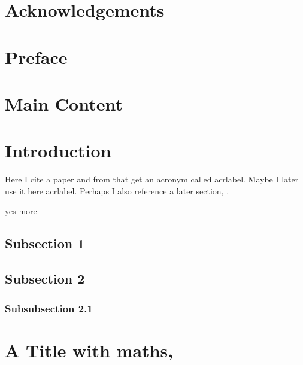 \documentclass[12pt]{article}
\begin{document}
\section*{Acknowledgements}\label{Acknowledgements}
\vspace{2em}

\section*{Preface}\label{Preface}
\vspace{2em}
\blindtext


\newpage
{}
\section*{Main Content}%


\section{Introduction} \label{Sec: Introduction}
Here I cite a paper \cite{Example_Reference} and from that get an acronym called \acrfull{acrlabel}. Maybe I later use it here \ac{acrlabel}. Perhaps I also reference a later section, \secref{\ref{Sec: A Title with Maths}}.

yes more
\subsection{Subsection 1}
\blindtext

\subsection{Subsection 2}
\blindtext

\subsubsection{Subsubsection 2.1}


\section{A Title with maths, }\label{Sec: A Title with Maths}
\end{document}
